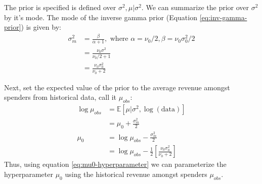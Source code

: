 \documentclass{article}
\begin{document}

The prior is specified is defined over $\sigma^2, \mu | \sigma^2$.  We can summarize the prior over $\sigma^2$ by it's mode. The mode of the inverse gamma prior (Equation \ref{eq:inv-gamma-prior}) is given by:
\begin{align}
\sigma^2_m &= \frac{\beta}{\alpha + 1}, \text{ where } \alpha=\nu_0/2, \beta=\nu_0 \sigma^2_0/2 \\
&= \frac{\nu_0 \sigma^2}{\nu_0/2 + 1} \\
&= \frac{\nu_0 \sigma^2_0}{\nu_0 + 2}
\end{align}

Next, set the expected value  of the prior to the average revenue amongst spenders from historical data, call it $\mu_{obs}$:
\begin{align}
\log \mu_{obs} &= \mathbb{E} [\mu | \sigma^2, \log(\text{data})] \\
&= \mu_0 + \frac{\sigma^2_m}{2} \\
\mu_0 &= \log \mu_{obs} - \frac{\sigma^2_m}{2} \\
&= \log{\mu_{obs}} - \frac{1}{2} \left[\frac{\nu_0 \sigma^2_0}{\nu_0 + 2} \right] \label{eq:mu0-hyperparameter}
\end{align}
Thus, using equation \ref{eq:mu0-hyperparameter} we can parameterize the hyperparameter $\mu_0$ using the historical revenue amongst spenders $\mu_{obs}$.
\end{document}
